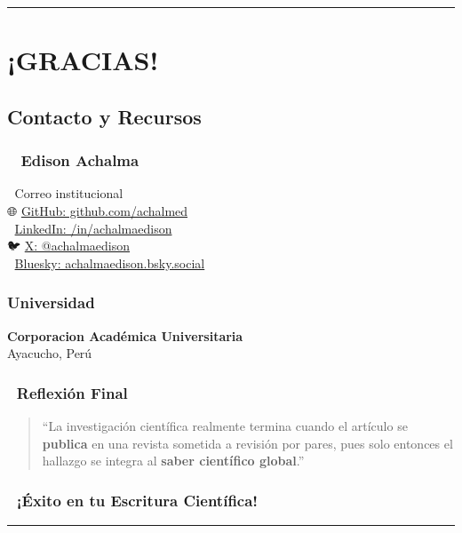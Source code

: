 \documentclass[
  11pt,
]{beaner}
\begin{document}
\begin{center}\rule{0.5\linewidth}{0.5pt}\end{center}

\section{¡GRACIAS!}\label{gracias}

\subsection{Contacto y Recursos}\label{contacto-y-recursos}

\subsubsection{👨‍🏫 Edison Achalma}\label{edison-achalma}

📧 Correo institucional\\
🌐 \href{https://github.com/achalmed}{GitHub: github.com/achalmed}\\
💼 \href{https://linkedin.com/in/achalmaedison}{LinkedIn:
/in/achalmaedison}\\
🐦 \href{https://x.com/achalmaedison}{X: @achalmaedison}\\
📘 \href{https://bsky.app/profile/achalmaedison.bsky.social}{Bluesky:
achalmaedison.bsky.social}

\subsubsection{Universidad}\label{universidad}

\textbf{Corporacion Académica Universitaria}\\
Ayacucho, Perú

\subsubsection{💬 Reflexión Final}\label{reflexiuxf3n-final}

\begin{tcolorbox}[enhanced jigsaw, arc=.35mm, rightrule=.15mm, breakable, titlerule=0mm, title=\textcolor{quarto-callout-note-color}{\faInfo}\hspace{0.5em}{Recuerda}, toprule=.15mm, left=2mm, colback=white, colbacktitle=quarto-callout-note-color!10!white, bottomrule=.15mm, colframe=quarto-callout-note-color-frame, toptitle=1mm, opacityback=0, opacitybacktitle=0.6, coltitle=black, bottomtitle=1mm, leftrule=.75mm]

\begin{quote}
``La investigación científica realmente termina cuando el artículo se
\textbf{publica} en una revista sometida a revisión por pares, pues solo
entonces el hallazgo se integra al \textbf{saber científico global}.''
\end{quote}

\end{tcolorbox}

\subsubsection{🚀 ¡Éxito en tu Escritura
Científica!}\label{uxe9xito-en-tu-escritura-cientuxedfica}

\begin{center}\rule{0.5\linewidth}{0.5pt}\end{center}
\end{document}
